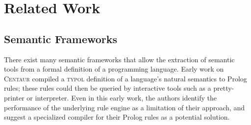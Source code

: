 \documentclass{article}
\theoremstyle{definition}
\newcommand{\bc}[1]{{\color{orange}BC: #1}}
\newcommand{\K}{$\mathbb{K}$\xspace}
\newcommand{\KH}{Haskell-\K}
\newcommand{\KL}{LLVM-\K}
\begin{document}
\begin{comment}
\subsection{Challenges and Contributions}

\bc{
  This needs reworking to not mention the Haskell backend, or to mention and
  then immediately discharge it.
}

There have been two main challenges with the existing \K implementations:
performance and the ability to carry out complex symbolic analysis based on 
formal semantics. 
In terms of performance, the \K-generated language interpreters were much 
slower than the interpreters written by humans. 
In terms of the ability to carry out symbolic analysis, the previous \K 
implementations \cite{oopsla16} only considered deductive program verification,
but not other types of formal analysis. 

In this work, we solve the first challenge by implementing a new backend based 
on LLVM, denoted \KL. 
\KL uses innovative algorithms for pattern matching and substitution and 
improve the performance of program execution by several orders of magnitude. 
Our experiments show that \KL generates interpreters that are \emph{faster}
than hand-written interpreters for real languages, marking one of the most 
important milestone.

The second challenge is a small foundation for symbolic reasoning of language 
properties. 
Previously, symbolic reasoning in \K backends is implemented in an ad-hoc way. 
In this work, we propose a new \K backend, \KH, that provides a set of symbolic 
reasoning APIs and use them to implement all formal analysis, including 
deductive program verifiers and bounded model checkers. 
content...
\end{comment}


\section{Related Work} \label{sec:related}
\subsection{Semantic Frameworks}

There exist many semantic frameworks that allow the extraction of semantic tools
from a formal definition of a programming language. Early work on
\textsc{Centaur} \cite{BCD+88} compiled a \textsc{typol} \cite{Despeyroux1988}
definition of a language's natural semantics to Prolog rules; these rules could
then be queried by interactive tools such as a pretty-printer or interpreter.
Even in this early work, the authors identify the performance of the underlying
rule engine as a limitation of their approach, and suggest a specialized
compiler for their Prolog rules as a potential solution.
\end{document}
